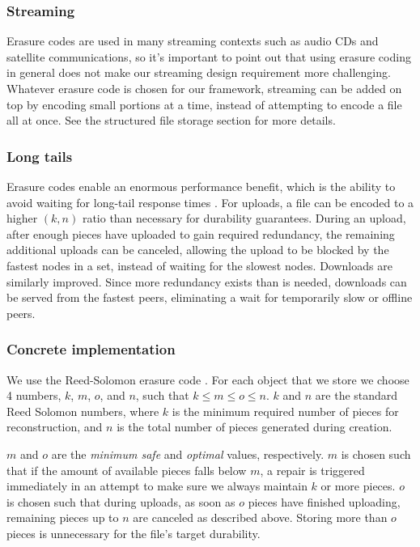\documentclass[a4paper,10pt]{article} \usepackage[utf8]{inputenc}
\begin{document}
\subsubsection{Streaming}

Erasure codes are used in many streaming contexts such as audio CDs and
satellite communications, so it's important to point out that using erasure
coding in general does not make our streaming design requirement more
challenging. Whatever erasure code is chosen for our framework, streaming can be
added on top by encoding small portions at a time, instead of attempting to
encode a file all at once. See the structured file storage section for more
details.

\subsubsection{Long tails}

Erasure codes enable an enormous performance benefit, which is the ability to
avoid waiting for long-tail response times \cite{tail-at-scale}. For uploads, a
file can be encoded to a higher $(k, n)$ ratio than necessary for durability
guarantees. During an upload, after enough pieces have uploaded to gain required
redundancy, the remaining additional uploads can be canceled, allowing the
upload to be blocked by the fastest nodes in a set, instead of waiting for the
slowest nodes. Downloads are similarly improved. Since more redundancy exists
than is needed, downloads can be served from the fastest peers, eliminating a
wait for temporarily slow or offline peers.

\subsubsection{Concrete implementation}

We use the Reed-Solomon erasure code \cite{rs}. For each object that we store
we choose 4 numbers, $k$, $m$, $o$, and $n$, such that $k\le m\le o\le n$.
$k$ and $n$ are the standard Reed Solomon numbers, where $k$ is the minimum
required number of pieces for reconstruction, and $n$ is the total number of
pieces generated during creation.

$m$ and $o$ are the {\em minimum safe} and {\em optimal} values, respectively.
$m$ is chosen such that if the amount of available pieces falls below $m$, a
repair is triggered immediately in an attempt to make sure we always maintain
$k$ or more pieces. $o$ is chosen such that during uploads, as soon as $o$
pieces have finished uploading, remaining pieces up to $n$ are canceled as
described above. Storing more than $o$ pieces is unnecessary for the file's
target durability.
\end{document}
